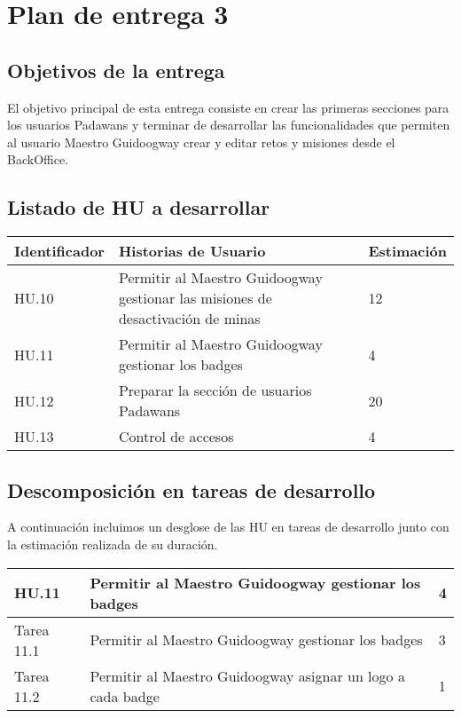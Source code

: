 \section{Plan de entrega 3}

\subsection{Objetivos de la entrega}

El objetivo principal de esta entrega consiste en crear las primeras secciones para los usuarios Padawans y terminar de desarrollar las funcionalidades que permiten al usuario Maestro Guidoogway crear y editar retos y misiones desde el BackOffice.

\subsection{Listado de HU a desarrollar}

\begin{table}[h]
	\centering
	\begin{tabular}{| p{2.3cm} | p{6.7cm} | p{2cm} |}
		\rowcolor[HTML]{329A9D} 
		{\color[HTML]{FFFFFF} \textbf{Identificador}} & {\color[HTML]{FFFFFF} \textbf{Historias de Usuario}} & {\color[HTML]{FFFFFF} \textbf{Estimación}}  \\ \hline
		HU.10 & Permitir al Maestro Guidoogway gestionar las misiones de desactivación de minas & 12 \\ \hline
		HU.11 & Permitir al Maestro Guidoogway gestionar los badges & 4 \\ \hline
		HU.12 & Preparar la sección de usuarios Padawans & 20 \\ \hline
		HU.13 & Control de accesos & 4 \\ \hline
	\end{tabular}
\end{table}

\subsection{Descomposición en tareas de desarrollo}

A continuación incluimos un desglose de las HU en tareas de desarrollo junto con la estimación realizada de su duración.\\

\begin{table}[h]
	\centering
	\begin{tabular}{| p{2.3cm} | p{6.7cm} | p{2cm} |}
		\rowcolor[HTML]{329A9D} 
		{\color[HTML]{FFFFFF} \textbf{HU.11}} & {\color[HTML]{FFFFFF} \textbf{Permitir al Maestro Guidoogway gestionar los badges}} & {\color[HTML]{FFFFFF} \textbf{4}}  \\ \hline
		Tarea 11.1 & Permitir al Maestro Guidoogway gestionar los badges & 3 \\ \hline
		Tarea 11.2 & Permitir al Maestro Guidoogway asignar un logo a cada badge  & 1 \\ \hline
	\end{tabular}
\end{table}

